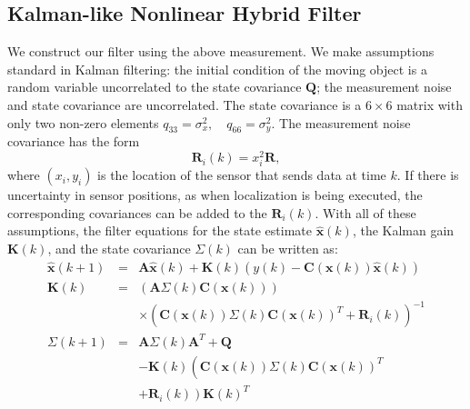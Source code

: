 \subsection{Kalman-like Nonlinear Hybrid Filter}
We construct our filter using the above measurement. We make assumptions standard in Kalman filtering: the initial condition of the moving object is a random variable uncorrelated to the state covariance $\mathbf{Q}$;  the measurement noise and state covariance are uncorrelated. The state covariance is a $6 \times 6$ matrix with only two non-zero elements $q_{33}=\sigma_x^2,\quad q_{66}=\sigma_y^2$. The measurement noise covariance has the form
\begin{equation}\label{eqn:Rk}
    \mathbf{R}_i(k)=x_i^2\mathbf{R},
\end{equation}
where $(x_i,y_i)$ is the location of the sensor that sends data at time $k$. If there is uncertainty in sensor positions, as when localization is being executed, the corresponding covariances can be added to the $\mathbf{R}_i(k)$. With all of these assumptions, the filter equations for the state estimate $\mathbf{\hat{x}}(k)$, the Kalman gain $\mathbf{K}(k)$, and the state covariance ${\Sigma}(k)$ can be written as:
 \begin{eqnarray}
   \mathbf{\hat{x}}(k+1) &=& \mathbf{A}\mathbf{\hat{x}}(k)+ \mathbf{K}(k)\left(y(k)-\mathbf{C}\left(\mathbf{x}(k)\right)\mathbf{\hat{x}}(k)\right)\label{eqn:Kalman-likeFilter}\\
   \mathbf{K}(k) &=& \left(\mathbf{A}{\Sigma}(k)\mathbf{C}\left(\mathbf{x}(k)\right)\right)\nonumber\\
   &&\times\left(\mathbf{C}\left(\mathbf{x}(k)\right){\Sigma}(k)\mathbf{C}\left(\mathbf{x}(k)\right)^T+\mathbf{R}_i(k)\right)^{-1} \label{eqn:FilterGainUpdate}\\
   {\Sigma}(k+1)&=& \mathbf{A}{\Sigma}(k)\mathbf{A}^T+\mathbf{Q}\nonumber\\
   &&-\mathbf{K}(k)\left(\mathbf{C}\left(\mathbf{x}(k)\right){\Sigma}(k)\mathbf{C}\left(\mathbf{x}(k)\right)^T\right.\nonumber\\
   &&\left.+\mathbf{R}_i(k)\right)\mathbf{K}(k)^T \label{eqn:FilterCovUpdate}
 \end{eqnarray}

